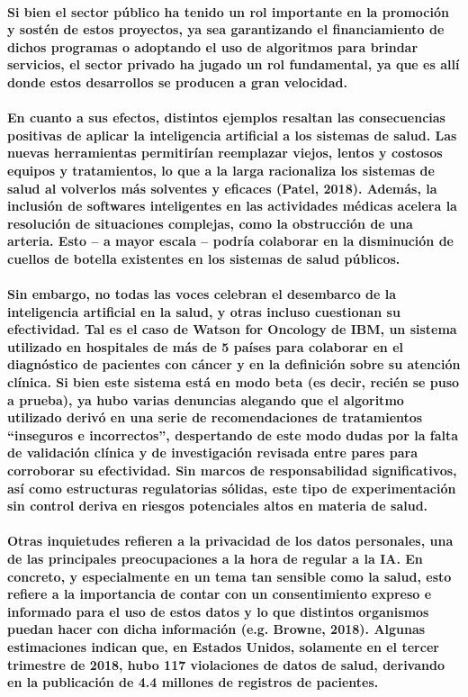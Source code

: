 \documentclass[a4paper,12pt]{article}
\begin{document}
\paragraph{Si bien el sector público ha tenido un rol importante en la promoción y sostén de estos proyectos, ya sea garantizando el financiamiento de dichos programas o adoptando el uso de algoritmos para brindar servicios, el sector privado ha jugado un rol fundamental, ya que es allí donde estos desarrollos se producen a gran velocidad.}
\paragraph{En cuanto a sus efectos, distintos ejemplos resaltan las consecuencias positivas de aplicar la inteligencia artificial a los sistemas de salud. Las nuevas herramientas permitirían reemplazar viejos, lentos y costosos equipos y tratamientos, lo que a la larga racionaliza los sistemas de salud al volverlos más solventes y eficaces (Patel, 2018). Además, la inclusión de softwares inteligentes en las actividades médicas acelera la resolución de situaciones complejas, como la obstrucción de una arteria. Esto – a mayor escala – podría colaborar en la disminución de cuellos de botella existentes en los sistemas de salud públicos.}
\paragraph{Sin embargo, no todas las voces celebran el desembarco de la inteligencia artificial en la salud, y otras incluso cuestionan su efectividad. Tal es el caso de Watson for Oncology de IBM, un sistema utilizado en hospitales de más de 5 países para colaborar en el diagnóstico de pacientes con cáncer y en la definición sobre su atención clínica. Si bien este sistema está en modo beta (es decir, recién se puso a prueba), ya hubo varias denuncias alegando que el algoritmo utilizado derivó en una serie de recomendaciones de tratamientos “inseguros e incorrectos”, despertando de este modo dudas por la falta de validación clínica y de investigación revisada entre pares para corroborar su efectividad. Sin marcos de responsabilidad significativos, así como estructuras regulatorias sólidas, este tipo de experimentación sin control deriva en riesgos potenciales altos en materia de salud.}
\paragraph{Otras inquietudes refieren a la privacidad de los datos personales, una de las principales preocupaciones a la hora de regular a la IA. En concreto, y especialmente en un tema tan sensible como la salud, esto refiere a la importancia de contar con un consentimiento expreso e informado para el uso de estos datos y lo que distintos organismos puedan hacer con dicha información (e.g. Browne, 2018). Algunas estimaciones indican que, en Estados Unidos, solamente en el tercer trimestre de 2018, hubo 117 violaciones de datos de salud, derivando en la publicación de 4.4 millones de registros de pacientes.}
\end{document}
